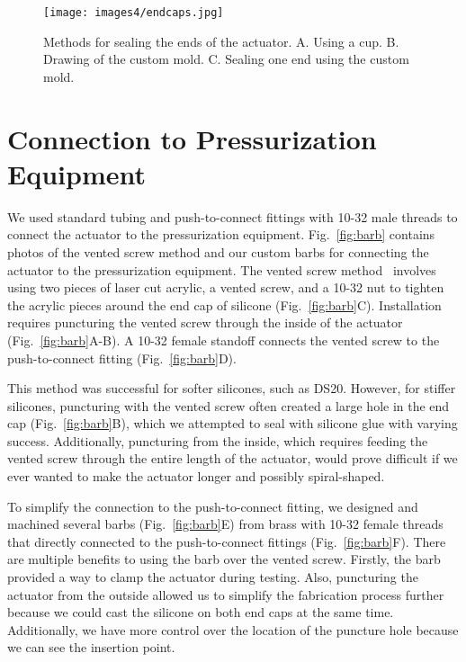 \begin{figure}[ht!]
    \centering
    \texttt{[image: images4/endcaps.jpg]}
    \caption{Methods for sealing the ends of the actuator. A. Using a cup. B. Drawing of the custom mold. C. Sealing one end using the custom mold.}
    \label{fig:endcaps}
\end{figure}

\clearpage
\section{Connection to Pressurization Equipment}

We used standard tubing and push-to-connect fittings with 10-32 male threads to connect the actuator to the pressurization equipment. Fig.~\ref{fig:barb} contains photos of the vented screw method and our custom barbs for connecting the actuator to the pressurization equipment. The vented screw method~\cite{polygerinos_modeling_2015} involves using two pieces of laser cut acrylic, a vented screw, and a 10-32 nut to tighten the acrylic pieces around the end cap of silicone (Fig.~\ref{fig:barb}C). Installation requires puncturing the vented screw through the inside of the actuator (Fig.~\ref{fig:barb}A-B). A 10-32 female standoff connects the vented screw to the push-to-connect fitting (Fig.~\ref{fig:barb}D). 

This method was successful for softer silicones, such as DS20. However, for stiffer silicones, puncturing with the vented screw often created a large hole in the end cap (Fig.~\ref{fig:barb}B), which we attempted to seal with silicone glue with varying success. Additionally, puncturing from the inside, which requires feeding the vented screw through the entire length of the actuator, would prove difficult if we ever wanted to make the actuator longer and possibly spiral-shaped. 

To simplify the connection to the push-to-connect fitting, we designed and machined several barbs (Fig.~\ref{fig:barb}E) from brass with 10-32 female threads that directly connected to the push-to-connect fittings (Fig.~\ref{fig:barb}F). There are multiple benefits to using the barb over the vented screw. Firstly, the barb provided a way to clamp the actuator during testing. Also, puncturing the actuator from the outside allowed us to simplify the fabrication process further because we could cast the silicone on both end caps at the same time. Additionally, we have more control over the location of the puncture hole because we can see the insertion point. 

